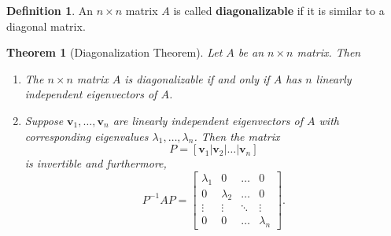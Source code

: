 \documentclass[12pt]{article}
\renewcommand{\vec}[1]{\mathbf{#1}}
\newtheorem{theorem}{Theorem}
\theoremstyle{definition}
\newtheorem{definition}{Definition}
\begin{document}
\begin{definition}
	An $n \times n$ matrix $A$ is called \textbf{diagonalizable} if it is similar to a diagonal matrix. 
\end{definition}


\begin{theorem}[Diagonalization Theorem]
	Let $A$ be an $n \times n$ matrix. Then
	\begin{enumerate}
		\item 	The $n \times n$ matrix $A$ is diagonalizable if and only if $A$ has $n$ linearly independent eigenvectors of $A$. 
		\item Suppose $\vec{v}_1, \hdots, \vec{v}_n$ are linearly independent eigenvectors of $A$ with corresponding eigenvalues $\lambda_1, \hdots, \lambda_n$. Then the matrix
			\[P = [\vec{v}_1 | \vec{v}_2 | \hdots | \vec{v}_n]	\]
	is invertible and furthermore,
		\[P^{-1}AP =  \begin{bmatrix}
			\lambda_1 & 0 & \hdots & 0 \\
			0 & \lambda_2 & \hdots & 0 \\
			\vdots & \vdots & \ddots & \vdots \\
			0	&	0	& \hdots	& \lambda_n
		\end{bmatrix}.	\]
	\end{enumerate}
\end{theorem}
\end{document}
